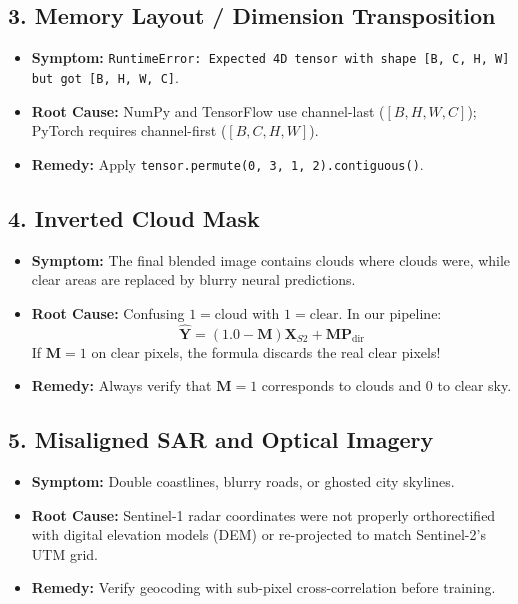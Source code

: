 \subsection{3. Memory Layout / Dimension Transposition}
\begin{itemize}
    \item \textbf{Symptom:} \texttt{RuntimeError: Expected 4D tensor with shape [B, C, H, W] but got [B, H, W, C]}.
    \item \textbf{Root Cause:} NumPy and TensorFlow use channel-last ($[B, H, W, C]$); PyTorch requires channel-first ($[B, C, H, W]$).
    \item \textbf{Remedy:} Apply \texttt{tensor.permute(0, 3, 1, 2).contiguous()}.
\end{itemize}

\subsection{4. Inverted Cloud Mask}
\begin{itemize}
    \item \textbf{Symptom:} The final blended image contains clouds where clouds were, while clear areas are replaced by blurry neural predictions.
    \item \textbf{Root Cause:} Confusing $1 = \text{cloud}$ with $1 = \text{clear}$. In our pipeline:
    \begin{equation}
    \hat{\mathbf{Y}} = (1.0 - \mathbf{M}) \mathbf{X}_{S2} + \mathbf{M} \mathbf{P}_{\text{dir}}
    \end{equation}
    If $\mathbf{M} = 1$ on clear pixels, the formula discards the real clear pixels!
    \item \textbf{Remedy:} Always verify that $\mathbf{M} = 1$ corresponds to clouds and $0$ to clear sky.
\end{itemize}

\subsection{5. Misaligned SAR and Optical Imagery}
\begin{itemize}
    \item \textbf{Symptom:} Double coastlines, blurry roads, or ghosted city skylines.
    \item \textbf{Root Cause:} Sentinel-1 radar coordinates were not properly orthorectified with digital elevation models (DEM) or re-projected to match Sentinel-2's UTM grid.
    \item \textbf{Remedy:} Verify geocoding with sub-pixel cross-correlation before training.
\end{itemize}


